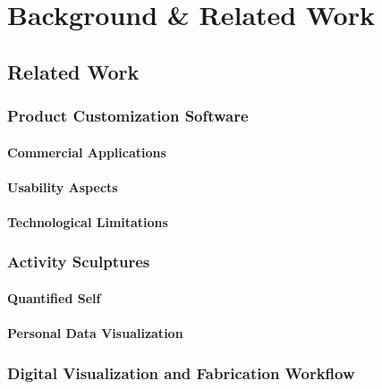 \chapter{Background \& Related Work}
\label{ch:related}

\section{Related Work}
\subsection{Product Customization Software}
\subsubsection{Commercial Applications}
\subsubsection{Usability Aspects}
\subsubsection{Technological Limitations}
\subsection{Activity Sculptures}
\subsubsection{Quantified Self}
\subsubsection{Personal Data Visualization}
\subsection{Digital Visualization and Fabrication Workflow}




